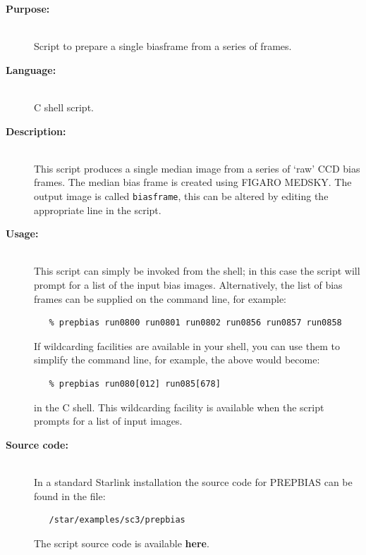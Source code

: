 \documentclass[twoside,11pt]{article}
\newenvironment{latexonly}{}{}
\newcommand{\htmlref}[2]{#1}
\newcommand{\xref}[3]{#1}
\begin{document}
\begin{description}

\item [{\bf Purpose:}] \mbox{} \\
     Script to prepare a single biasframe from a series of frames.

\item [{\bf Language:}] \mbox{} \\
     C shell script.

\item [{\bf Description:}] \mbox{} \\
     This script produces a single median image from a series of
     `raw' CCD bias frames.  The median bias frame is created using
     \xref{FIGARO}{sun86}{} \xref{MEDSKY}{sun86}{MEDSKY}.  The output
     image is called \verb+biasframe+, this can be altered by editing
     the appropriate line in the script.

\item [{\bf Usage:}] \mbox{} \\
     This script can simply be invoked from the shell; in this case
     the script will prompt for a list of the input bias images.
     Alternatively, the list of bias frames can be supplied on the
     command line, for example:

\begin{verbatim}
   % prepbias run0800 run0801 run0802 run0856 run0857 run0858
\end{verbatim}

     If wildcarding facilities are available in your shell, you can use
     them to simplify the command line, for example, the above would
     become:

\begin{verbatim}
   % prepbias run080[012] run085[678]
\end{verbatim}

     in the C shell.  This wildcarding facility is available when the
     script prompts for a list of input images.

\item [{\bf Source code:}] \mbox{} \\
\begin{latexonly}
In a standard Starlink installation the source code for PREPBIAS can be found
in the file:
\begin{verbatim}
   /star/examples/sc3/prepbias
\end{verbatim}
\end{latexonly}
\begin{htmlonly}
      The script source code is available
      \htmlref{{\bf here}}{se_prepbias_source}.
\end{htmlonly}


\end{description}
\end{document}
